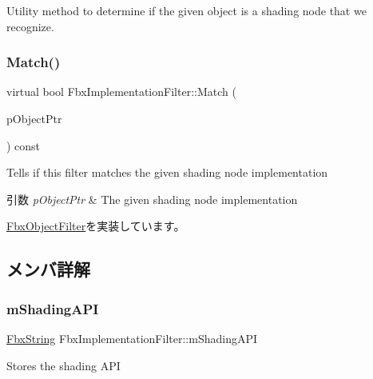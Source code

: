 Utility method to determine if the given object is a shading node that we recognize. \mbox{\label{class_fbx_implementation_filter_a59ab32592ea71f1853f1cc5f641a341d}} 
\subsubsection{\texorpdfstring{Match()}{Match()}}
{\footnotesize\ttfamily virtual bool Fbx\+Implementation\+Filter\+::\+Match (\begin{DoxyParamCaption}\item[{const \hyperlink{class_fbx_object}{Fbx\+Object} $\ast$}]{p\+Object\+Ptr }\end{DoxyParamCaption}) const\hspace{0.3cm}{\ttfamily [virtual]}}

Tells if this filter matches the given shading node implementation 
\begin{DoxyParams}{引数}
{\em p\+Object\+Ptr} & The given shading node implementation \\
\hline
\end{DoxyParams}


\hyperlink{class_fbx_object_filter_a49cc7b7c109f98910241d62ec0bd093b}{Fbx\+Object\+Filter}を実装しています。



\subsection{メンバ詳解}
\mbox{\label{class_fbx_implementation_filter_afc2611e4f45d48ce02a04f98b7d84879}} 
\subsubsection{\texorpdfstring{m\+Shading\+A\+PI}{mShadingAPI}}
{\footnotesize\ttfamily \hyperlink{class_fbx_string}{Fbx\+String} Fbx\+Implementation\+Filter\+::m\+Shading\+A\+PI}



Stores the shading A\+PI 

